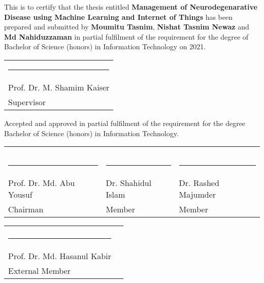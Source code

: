 This is to certify that the thesis entitled \textbf{Management of Neurodegenarative Disease using Machine Learning and Internet of Things}
has been prepared and submitted by \textbf{Moumitu Tasnim}, \textbf{Nishat Tasnim Newaz} and \textbf{Md Nahiduzzaman} in partial fulfilment of the requirement for the degree of Bachelor of Science (honors) in Information Technology on 2021.

\bigskip
\bigskip
\bigskip
\bigskip
\bigskip

\noindent \begin{tabular}{l}

  \rule{4cm}{1pt} \\
Prof.  Dr. M. Shamim Kaiser\\ %
  Supervisor\\

\end{tabular}

\bigskip
\bigskip
\bigskip

Accepted and approved in partial fulfilment of the requirement for the degree Bachelor of Science (honors) in Information Technology.

\bigskip
\bigskip

\noindent \begin{tabular}{p{5cm}p{5cm}p{5cm}}
\centering
     &  &   \\
     &  &   \\
     &  &   \\
  \rule{4cm}{1pt} & \rule{4cm}{1pt} & \rule{4cm}{1pt}\\
  Prof. Dr. Md. Abu Yousuf & Dr. Shahidul Islam & Dr. Rashed Majumder\\
  Chairman & Member  & Member\\

\end{tabular}

\noindent \begin{tabular}{p{7cm}}
\centering
    &  &\\
     \rule{4cm}{1pt}\\
     Prof. Dr. Md. Hasanul
Kabir\\
External Member\\
\end{tabular}


